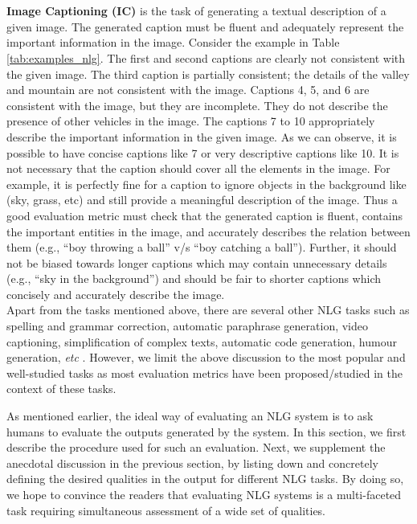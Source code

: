 \\\\
\textbf{Image Captioning (IC)} is the task of generating a textual description of a given image. The generated caption must be fluent and adequately represent the important information in the image. Consider the example in Table \ref{tab:examples_nlg}. The first and second captions are clearly not consistent with the given image. The third caption is partially consistent; the details of the valley and mountain are not consistent with the image.  Captions 4, 5, and 6 are consistent with the image, but they are incomplete. They do not describe the presence of other vehicles in the image. The captions 7 to 10 appropriately describe the important information in the given image. As we can observe, it is possible to have concise captions like 7 or very descriptive captions like 10. It is not necessary that the caption should cover all the elements in the image. For example, it is perfectly fine for a caption to ignore objects in the background like (sky, grass, etc) and still provide a meaningful description of the image. Thus a good evaluation metric must check that the generated caption is fluent, contains the important entities in the image, and accurately describes the relation between them (e.g., ``boy throwing a ball'' v/s ``boy catching a ball''). Further, it should not be biased towards longer captions which may contain unnecessary details (e.g., ``sky in the background'') and should be fair to shorter captions which concisely and accurately describe the image. \\
Apart from the tasks mentioned above, there are several other NLG tasks such as spelling and grammar correction, automatic paraphrase generation, video captioning, simplification of complex texts, automatic code generation, humour generation, \textit{etc} . However, we limit the above discussion to the most popular and well-studied tasks as most evaluation metrics have been proposed/studied in the context of these tasks.

\label{sec:human_eval}
As mentioned earlier, the ideal way of evaluating an NLG system is to ask humans to evaluate the outputs generated by the system. In this section, we first describe the procedure used for such an evaluation. Next, we supplement the anecdotal discussion in the previous section, by listing down and concretely defining the desired qualities in the output for different NLG tasks. By doing so, we hope to convince the readers that evaluating NLG systems is a multi-faceted task requiring simultaneous assessment of a wide set of qualities.

